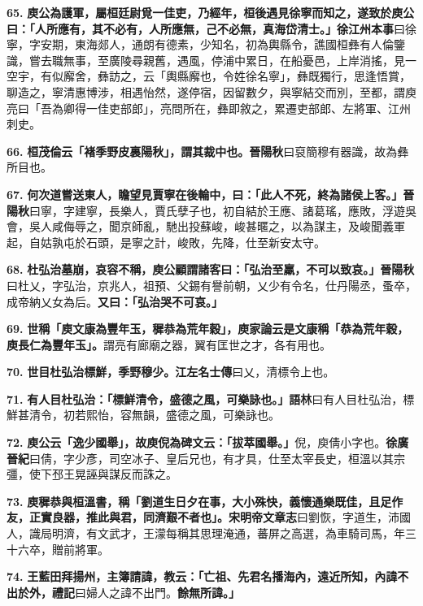 \textbf{65.} \textbf{庾公為護軍，屬桓廷尉覓一佳吏，乃經年，桓後遇見徐寧而知之，遂致於庾公曰：「人所應有，其不必有，人所應無，己不必無，真海岱清士。」}{\footnotesize \textbf{徐江州本事}曰徐寧，字安期，東海郯人，通朗有德素，少知名，初為輿縣令，譙國桓彝有人倫鑒識，嘗去職無事，至廣陵尋親舊，遇風，停浦中累日，在船憂邑，上岸消搖，見一空宇，有似廨舍，彝訪之，云「輿縣廨也，令姓徐名寧」，彝既獨行，思逢悟賞，聊造之，寧清惠博涉，相遇怡然，遂停宿，因留數夕，與寧結交而別，至都，謂庾亮曰「吾為卿得一佳吏部郎」，亮問所在，彝即敘之，累遷吏部郎、左將軍、江州刺史。}

\textbf{66.} \textbf{桓茂倫云「褚季野皮裏陽秋」，謂其裁中也。}{\footnotesize \textbf{晉陽秋}曰裒簡穆有器識，故為彝所目也。}

\textbf{67.} \textbf{何次道嘗送東人，瞻望見賈寧在後輪中，曰：「此人不死，終為諸侯上客。」}{\footnotesize \textbf{晉陽秋}曰寧，字建寧，長樂人，賈氏孽子也，初自結於王應、諸葛瑤，應敗，浮遊吳會，吳人咸侮辱之，聞京師亂，馳出投蘇峻，峻甚暱之，以為謀主，及峻聞義軍起，自姑孰屯於石頭，是寧之計，峻敗，先降，仕至新安太守。}

\textbf{68.} \textbf{杜弘治墓崩，哀容不稱，庾公顧謂諸客曰：「弘治至羸，不可以致哀。」}{\footnotesize \textbf{晉陽秋}曰杜乂，字弘治，京兆人，祖預、父錫有譽前朝，乂少有令名，仕丹陽丞，蚤卒，成帝納乂女為后。}\textbf{又曰：「弘治哭不可哀。」}

\textbf{69.} \textbf{世稱「庾文康為豐年玉，穉恭為荒年穀」，庾家論云是文康稱「恭為荒年穀，庾長仁為豐年玉」。}{\footnotesize 謂亮有廊廟之器，翼有匡世之才，各有用也。}

\textbf{70.} \textbf{世目杜弘治標鮮，季野穆少。}{\footnotesize \textbf{江左名士傳}曰乂，清標令上也。}

\textbf{71.} \textbf{有人目杜弘治：「標鮮清令，盛德之風，可樂詠也。」}{\footnotesize \textbf{語林}曰有人目杜弘治，標鮮甚清令，初若熙怡，容無韻，盛德之風，可樂詠也。}

\textbf{72.} \textbf{庾公云「逸少國舉」，故庾倪為碑文云：「拔萃國舉。」}{\footnotesize 倪，庾倩小字也。\textbf{徐廣晉紀}曰倩，字少彥，司空冰子、皇后兄也，有才具，仕至太宰長史，桓溫以其宗彊，使下邳王晃誣與謀反而誅之。}

\textbf{73.} \textbf{庾穉恭與桓溫書，稱「劉道生日夕在事，大小殊快，義懷通樂既佳，且足作友，正實良器，推此與君，同濟艱不者也」。}{\footnotesize \textbf{宋明帝文章志}曰劉恢，字道生，沛國人，識局明濟，有文武才，王濛每稱其思理淹通，蕃屏之高選，為車騎司馬，年三十六卒，贈前將軍。}

\textbf{74.} \textbf{王藍田拜揚州，主簿請諱，教云：「亡祖、先君名播海內，遠近所知，內諱不出於外，}{\footnotesize \textbf{禮記}曰婦人之諱不出門。}\textbf{餘無所諱。」}

